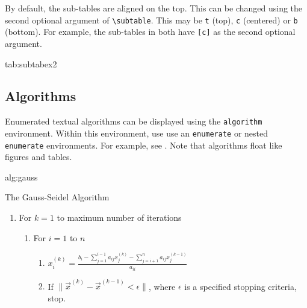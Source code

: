 \documentclass[pmlr]{jmlr}
\begin{document}
By default, the sub-tables are aligned on the top.
This can be changed using the second optional argument
of \verb|\subtable|. This may be \texttt{t} (top), \texttt{c}
(centered) or \texttt{b} (bottom). For example, the sub-tables
 in 
both have \verb|[c]| as the second optional argument.

\begin{table}[htbp]
\floatconts
 {tab:subtabex2}
 {\caption{Another Example With Sub-Tables}}
 {%
   \qquad
 }
\end{table}

\subsection{Algorithms}
\label{sec:algorithms}

Enumerated textual algorithms can be displayed using the
\texttt{algorithm} environment. Within this environment, use
use an \texttt{enumerate} or nested \texttt{enumerate} environments.
For example, see . Note that algorithms
float like figures and tables.

\begin{algorithm}[htbp]
\floatconts
{alg:gauss}%
{\caption{The Gauss-Seidel Algorithm}}
{%
\begin{enumerate}
  \item For $k=1$ to maximum number of iterations
    \begin{enumerate}
      \item For $i=1$ to $n$
        \begin{enumerate}
        \item $x_i^{(k)} = 
          \frac{b_i - \sum_{j=1}^{i-1}a_{ij}x_j^{(k)}
          - \sum_{j=i+1}^{n}a_{ij}x_j^{(k-1)}}{a_{ii}}$
        \item If $\|\vec{x}^{(k)}-\vec{x}^{(k-1)} < \epsilon\|$,
          where $\epsilon$ is a specified stopping criteria, stop.
      \end{enumerate}
    \end{enumerate}
\end{enumerate}
}
\end{algorithm}
\end{document}
